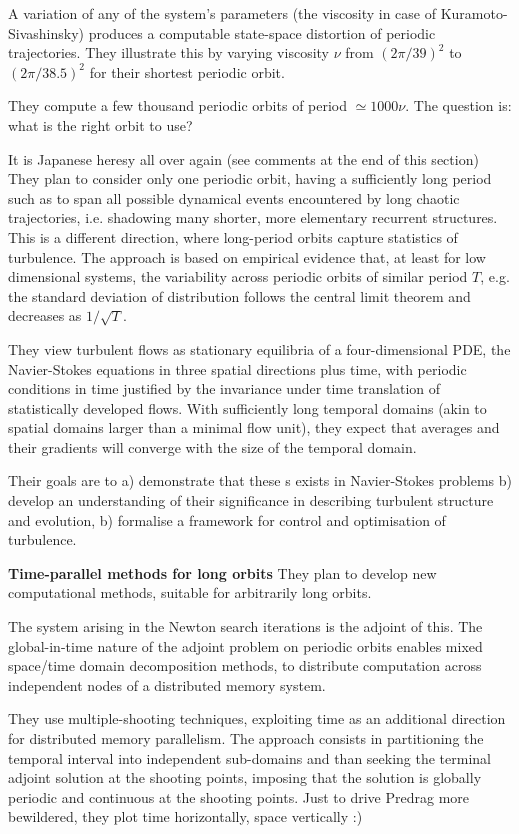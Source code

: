 A variation of any of the system's parameters (the viscosity in
case of {Kuramoto-Sivashinsky}) produces a computable state-space
distortion of periodic trajectories. They illustrate this by
varying viscosity $\nu$ from $(2\pi/39)^2$ to $(2\pi/38.5)^2$
for their shortest periodic orbit.

They compute a few thousand periodic orbits of period $\simeq 1000 \nu$. The
question is: what is the right orbit to use?

     {It is Japanese heresy all over again (see comments at the
                     end of this section)}
They plan to consider only one periodic orbit, having a sufficiently long period
such as to span all possible dynamical events encountered by long chaotic
trajectories, i.e. shadowing many shorter, more elementary recurrent structures.
This is a different direction, where long-period orbits capture statistics of
turbulence.
The approach is based on empirical evidence
that, at least for low dimensional systems, the
variability across periodic orbits of similar
period $T$, e.g. the standard deviation of distribution
follows
the central limit theorem and decreases as
$1/\sqrt{T}$.

They view
turbulent flows as stationary equilibria of a four-dimensional PDE,
the Navier-Stokes equations in three spatial directions plus time,
with periodic conditions in time justified by the invariance under
time translation of statistically developed flows. With
sufficiently long temporal domains (akin to spatial domains larger
than a minimal flow unit), they expect that averages and their
gradients will converge with the size of the temporal domain.

Their goals are to a) demonstrate that these \po s
exists in Navier-Stokes problems b) develop an
understanding of their significance in describing turbulent
structure and evolution, b)
formalise a framework for control and optimisation of turbulence.

{\bf Time-parallel methods for long orbits}
They plan to develop new computational methods, suitable for arbitrarily long
orbits.

The system arising in the Newton search iterations is the
adjoint of this.
The
global-in-time nature of the adjoint problem on periodic orbits
enables mixed space/time domain decomposition methods, to
distribute computation across independent nodes of a
distributed memory system.

They use multiple-shooting techniques, exploiting time as an
additional direction for distributed memory parallelism. The
approach consists in partitioning the temporal interval into
independent sub-domains and than seeking the terminal adjoint
solution at the shooting points, imposing that the solution is
globally periodic and continuous at the shooting points.
     {Just to drive Predrag more bewildered, they plot time
                     horizontally, space vertically :)}

